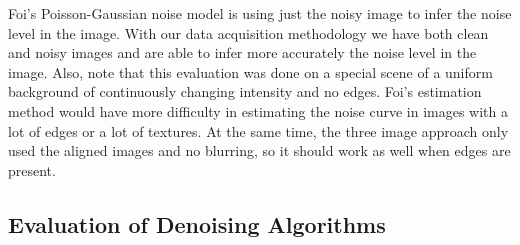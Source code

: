 \documentclass[review]{elsarticle}
\begin{document}
Foi's Poisson-Gaussian noise model is using just the noisy image to infer the noise level in the image. With our data acquisition methodology we have both clean and noisy images and are able to infer more accurately the noise level in the image. Also, note that this evaluation was done on a special scene of a uniform background of continuously changing intensity and no edges. Foi's estimation method would have more difficulty in estimating the noise curve in images with a lot of edges or a lot of textures. At the same time, the three image approach only used the aligned images and no blurring, so it should work as well when edges are present.

\subsection{Evaluation of Denoising Algorithms}
\end{document}
